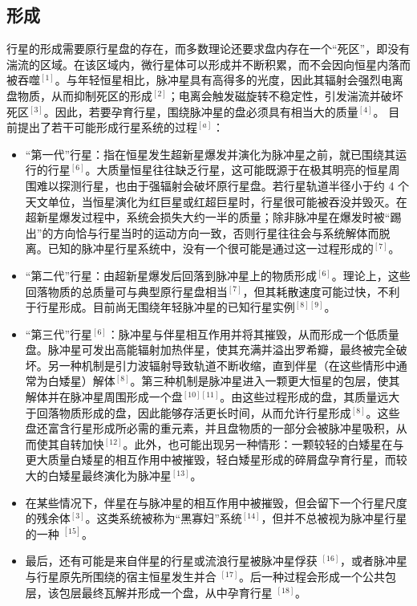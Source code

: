 \subsection{形成}
行星的形成需要原行星盘的存在，而多数理论还要求盘内存在一个“死区”，即没有湍流的区域。在该区域内，微行星体可以形成并不断积累，而不会因向恒星内落而被吞噬$^{[1]}$。与年轻恒星相比，脉冲星具有高得多的光度，因此其辐射会强烈电离盘物质，从而抑制死区的形成$^{[2]}$；电离会触发磁旋转不稳定性，引发湍流并破坏死区$^{[3]}$。因此，若要孕育行星，围绕脉冲星的盘必须具有相当大的质量$^{[4]}$。
目前提出了若干可能形成行星系统的过程$^{[a]}$：
\begin{itemize}
\item “第一代”行星：指在恒星发生超新星爆发并演化为脉冲星之前，就已围绕其运行的行星$^{[6]}$。大质量恒星往往缺乏行星，这可能既源于在极其明亮的恒星周围难以探测行星，也由于强辐射会破坏原行星盘。若行星轨道半径小于约 4 个天文单位，当恒星演化为红巨星或红超巨星时，行星很可能被吞没并毁灭。在超新星爆发过程中，系统会损失大约一半的质量；除非脉冲星在爆发时被“踢出”的方向恰与行星当时的运动方向一致，否则行星往往会与系统解体而脱离。已知的脉冲星行星系统中，没有一个很可能是通过这一过程形成的$^{[7]}$。
\item “第二代”行星：由超新星爆发后回落到脉冲星上的物质形成$^{[6]}$。理论上，这些回落物质的总质量可与典型原行星盘相当$^{[7]}$，但其耗散速度可能过快，不利于行星形成。目前尚无围绕年轻脉冲星的已知行星实例$^{[8][9]}$。
\item “第三代”行星$^{[6]}$：脉冲星与伴星相互作用并将其摧毁，从而形成一个低质量盘。脉冲星可发出高能辐射加热伴星，使其充满并溢出罗希瓣，最终被完全破坏。另一种机制是引力波辐射导致轨道不断收缩，直到伴星（在这些情形中通常为白矮星）解体$^{[8]}$。第三种机制是脉冲星进入一颗更大恒星的包层，使其解体并在脉冲星周围形成一个盘$^{[10][11]}$。由这些过程形成的盘，其质量远大于回落物质形成的盘，因此能够存活更长时间，从而允许行星形成$^{[8]}$。这些盘还富含行星形成所必需的重元素，并且盘物质的一部分会被脉冲星吸积，从而使其自转加快$^{[12]}$。此外，也可能出现另一种情形：一颗较轻的白矮星在与更大质量白矮星的相互作用中被摧毁，轻白矮星形成的碎屑盘孕育行星，而较大的白矮星最终演化为脉冲星$^{[13]}$。
\item 在某些情况下，伴星在与脉冲星的相互作用中被摧毁，但会留下一个行星尺度的残余体$^{[3]}$。这类系统被称为“黑寡妇”系统$^{[14]}$，但并不总被视为脉冲星行星的一种 $^{[15]}$。
\item 最后，还有可能是来自伴星的行星或流浪行星被脉冲星俘获 $^{[16]}$，或者脉冲星与行星原先所围绕的宿主恒星发生并合 $^{[17]}$。后一种过程会形成一个公共包层，该包层最终瓦解并形成一个盘，从中孕育行星 $^{[18]}$。
\end{itemize}
